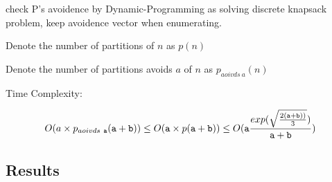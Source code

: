 \begin{algorithmic}
     
    \ENDIF
  \ENDFOR
\end{algorithmic}
check P's avoidence by Dynamic-Programming as solving discrete knapsack problem, keep avoidence vector when enumerating.

Denote the number of partitions of $n$ as $p(n)$

Denote the number of partitions avoids $a$ of $n$ as $p_{aoivds\ a}(n)$

Time Complexity: 

\[
O(a\times p_{aoivds\ \mathtt{a}}(\mathtt{a}+\mathtt{b}))\\
\leq O(\mathtt{a}\times p(\mathtt{a}+\mathtt{b}))\\
\leq O(\mathtt{a}\frac{exp(\sqrt{\frac{2(\mathtt{a}+\mathtt{b}))}{3} } )}{\mathtt{a}+\mathtt{b}})
\]

\pagebreak
\subsection{Results}

\pagebreak
